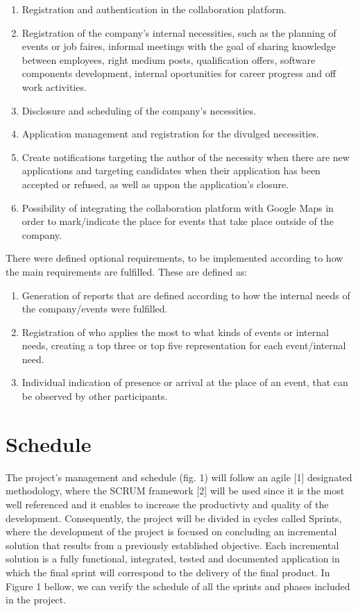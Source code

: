 \documentclass[a4paper,openright,12pt]{report}
\begin{document}
\begin{enumerate}
\item Registration and authentication in the collaboration platform.
\item Registration of the company's internal necessities, such as the planning of events or job faires, informal meetings with the goal of sharing knowledge between employees, right medium posts, qualification offers, software components development, internal oportunities for career progress and off work activities.
\item Disclosure and scheduling of the company's necessities.
\item Application management and registration for the divulged necessities.
\item Create notifications targeting the author of the necessity when there are new applications and targeting candidates when their application has been accepted or refused, as well as uppon the application's closure.
\item Possibility of integrating the collaboration platform with Google Maps in order to mark/indicate the place for events that take place outside of the company.
\end{enumerate}

There were defined optional requirements, to be implemented according to how the main requirements are fulfilled. These are defined as:

\begin{enumerate}
\item Generation of reports that are defined according to how the internal needs of the company/events were fulfilled.
\item Registration of who applies the most to what kinds of events or internal needs, creating a top three or top five representation for each event/internal need. 
\item Individual indication of presence or arrival at the place of an event, that can be observed by other participants.
\end{enumerate}

\section*{Schedule} 

The project's management and schedule (fig. 1) will follow an agile [1] designated methodology, where the SCRUM framework [2] will be used since it is the most well referenced and it enables to increase the productivty and quality of the development. Consequently, the project will be divided in cycles called Sprints, where the development of the project is focused on concluding an incremental solution that results from a previously established objective. Each incremental solution  is a fully functional, integrated, tested and documented application in which the final sprint will correspond to the delivery of the final product. In Figure 1 bellow, we can verify the schedule of all the sprints and phases included in the project.
\end{document}
